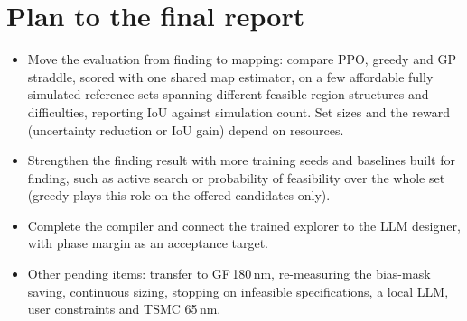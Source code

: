 \documentclass[10pt]{article}
\begin{document}
\section{Plan to the final report}\label{sec:goals}
\begin{itemize}
    \item Move the evaluation from finding to mapping: compare PPO, greedy and GP straddle, scored with one
  shared map estimator, on a few affordable fully simulated reference sets spanning different feasible-region structures
  and difficulties, reporting IoU against simulation count. Set sizes and the reward (uncertainty reduction or
  IoU gain) depend on resources.
  \item Strengthen the finding result with more training seeds and baselines built for finding, such as active
  search or probability of feasibility over the whole set (greedy plays this role on the offered candidates only).
  \item Complete the compiler and connect the trained explorer to the LLM designer, with phase margin as an
  acceptance target.
  \item Other pending items: transfer to GF\,180\,nm, re-measuring the bias-mask saving, continuous sizing, stopping on infeasible
  specifications, a local LLM, user constraints and TSMC 65\,nm.



\end{itemize}
\newpage
\end{document}
